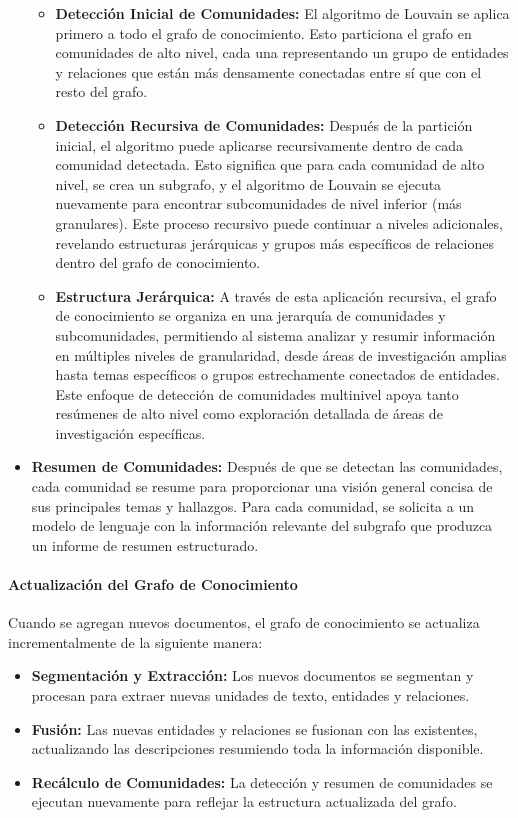 \documentclass[12pt]{article}
\begin{document}
\begin{itemize}
\begin{itemize}
    \item \textbf{Detección Inicial de Comunidades:} El algoritmo de Louvain se aplica primero a todo el grafo de conocimiento. Esto particiona el grafo en comunidades de alto nivel, cada una representando un grupo de entidades y relaciones que están más densamente conectadas entre sí que con el resto del grafo.
    \item \textbf{Detección Recursiva de Comunidades:} Después de la partición inicial, el algoritmo puede aplicarse recursivamente dentro de cada comunidad detectada. Esto significa que para cada comunidad de alto nivel, se crea un subgrafo, y el algoritmo de Louvain se ejecuta nuevamente para encontrar subcomunidades de nivel inferior (más granulares). Este proceso recursivo puede continuar a niveles adicionales, revelando estructuras jerárquicas y grupos más específicos de relaciones dentro del grafo de conocimiento.
    \item \textbf{Estructura Jerárquica:} A través de esta aplicación recursiva, el grafo de conocimiento se organiza en una jerarquía de comunidades y subcomunidades, permitiendo al sistema analizar y resumir información en múltiples niveles de granularidad, desde áreas de investigación amplias hasta temas específicos o grupos estrechamente conectados de entidades.
Este enfoque de detección de comunidades multinivel apoya tanto resúmenes de alto nivel como exploración detallada de áreas de investigación específicas.
\end{itemize}

    \item \textbf{Resumen de Comunidades:} 
Después de que se detectan las comunidades, cada comunidad se resume para proporcionar una visión general concisa de sus principales temas y hallazgos. Para cada comunidad, se solicita a un modelo de lenguaje con la información relevante del subgrafo que produzca un informe de resumen estructurado.
\end{itemize}



\paragraph{Actualización del Grafo de Conocimiento}
Cuando se agregan nuevos documentos, el grafo de conocimiento se actualiza incrementalmente de la siguiente manera:
\begin{itemize}
    \item \textbf{Segmentación y Extracción:} Los nuevos documentos se segmentan y procesan para extraer nuevas unidades de texto, entidades y relaciones.
    \item \textbf{Fusión:} Las nuevas entidades y relaciones se fusionan con las existentes, actualizando las descripciones resumiendo toda la información disponible.
    \item \textbf{Recálculo de Comunidades:} La detección y resumen de comunidades se ejecutan nuevamente para reflejar la estructura actualizada del grafo.
\end{itemize}
\end{document}
